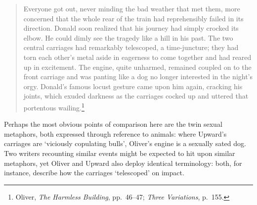 \documentclass[]{article}
\begin{document}
\begin{quote}
Everyone got out, never minding the bad weather that met them, more
concerned that the whole rear of the train had reprehensibly failed in
its direction. Donald soon realized that his journey had simply crocked
its elbow. He could dimly see the tragedy like a hill in his past. The
two central carriages had remarkably telescoped, a time-juncture; they
had torn each other's metal aside in eagerness to come together and had
reared up in excitement. The engine, quite unharmed, remained coupled on
to the front carriage and was panting like a dog no longer interested in
the night's orgy. Donald's famous locust gesture came upon him again,
cracking his joints, which exuded darkness as the carriages cocked up
and uttered that portentous wailing.\footnote{Oliver, \emph{The Harmless
  Building}, pp.~46--47; \emph{Three Variations}, p.~155.}
\end{quote}

\noindent Perhaps the most obvious points of comparison here are the
twin sexual metaphors, both expressed through reference to animals:
where Upward's carriages are `viciously copulating bulls', Oliver's
engine is a sexually sated dog. Two writers recounting similar events
might be expected to hit upon similar metaphors, yet Oliver and Upward
also deploy identical terminology: both, for instance, describe how the
carriages `telescoped' on impact.
\end{document}

